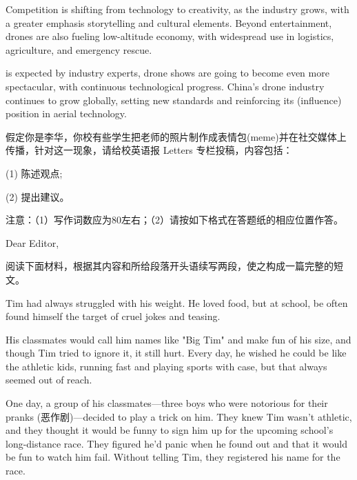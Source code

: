 \documentclass{英语试卷}
\begin{document}
\par Competition is shifting from technology to creativity, as the industry grows, with a greater emphasis  storytelling and cultural elements. Beyond entertainment, drones are also fueling  low-altitude economy, with widespread use in logistics, agriculture, and emergency rescue.\par
\par {} is expected by industry experts, drone shows are going to become even more spectacular, with continuous technological progress. China's drone industry continues to grow globally, setting new standards and reinforcing its  (influence) position in aerial technology.\par
{}
\par 假定你是李华，你校有些学生把老师的照片制作成表情包(meme)并在社交媒体上传播，针对这一现象，请给校英语报 Letters 专栏投稿，内容包括：\par
\par (1) 陈述观点;\par
\par (2) 提出建议。\par
\par 注意：（1）写作词数应为80左右；（2）请按如下格式在答题纸的相应位置作答。\par
\par Dear Editor,\par
{}
\par 阅读下面材料，根据其内容和所给段落开头语续写两段，使之构成一篇完整的短文。\par
\par Tim had always struggled with his weight. He loved food, but at school, be often found himself the target of cruel jokes and teasing.\par
\par His classmates would call him names like "Big Tim" and make fun of his size, and though Tim tried to ignore it, it still hurt. Every day, he wished he could be like the athletic kids, running fast and playing sports with case, but that always seemed out of reach.\par
\par One day, a group of his classmates—three boys who were notorious for their pranks (恶作剧)—decided to play a trick on him. They knew Tim wasn't athletic, and they thought it would be funny to sign him up for the upcoming school's long-distance race. They figured he'd panic when he found out and that it would be fun to watch him fail. Without telling Tim, they registered his name for the race.\par
\end{document}
